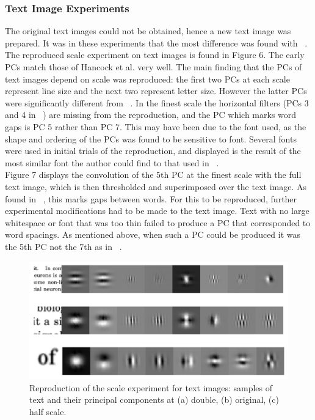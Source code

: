 \subsubsection{Text Image Experiments}
The original text images could not be obtained, hence a new text image was prepared. It was in these experiments that the most difference was found with ~\cite{Hancock}.\\
The reproduced scale experiment on text images is found in Figure 6. The early PCs match those of Hancock et al. very well. The main finding that the PCs of text images depend on scale was reproduced: the first two PCs at each scale represent line size and the next two represent letter size. However the latter PCs were significantly different from ~\cite{Hancock}. In the finest scale the horizontal filters (PCs 3 and 4 in ~\cite{Hancock}) are missing from the reproduction, and the PC which marks word gaps is PC 5 rather than PC 7. This may have been due to the font used, as the shape and ordering of the PCs was found to be sensitive to font. Several fonts were used in initial trials of the reproduction, and displayed is the result of the most similar font the author could find to that used in ~\cite{Hancock}.\\
Figure 7 displays the convolution of the 5th PC at the finest scale with the full text image, which is then thresholded and superimposed over the text image. As found in ~\cite{Hancock}, this marks gaps between words. For this to be reproduced, further experimental modifications had to be made to the text image. Text with no large whitespace or font that was too thin failed to produce a PC that corresponded to word spacings. As mentioned above, when such a PC could be produced it was the 5th PC not the 7th as in ~\cite{Hancock}. 
\begin{figure}
    \centering
    \includegraphics[scale=0.55]{figures/Figure6.png}
    \caption{Reproduction of the scale experiment for text images: samples of text and their principal components at (a) double, (b) original, (c) half scale.}
    \label{fig:Figure6}
\end{figure}
